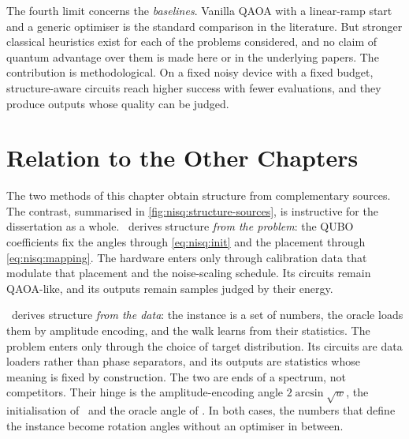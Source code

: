 The fourth limit concerns the \emph{baselines}. Vanilla QAOA with a linear-ramp start and a generic optimiser is the standard comparison in the literature. But stronger classical heuristics exist for each of the problems considered, and no claim of quantum advantage over them is made here or in the underlying papers. The contribution is methodological. On a fixed noisy device with a fixed budget, structure-aware circuits reach higher success with fewer evaluations, and they produce outputs whose quality can be judged.

\section{Relation to the Other Chapters}\label{sec:nisq:relation}

The two methods of this chapter obtain structure from complementary sources. The contrast, summarised in \cref{fig:nisq:structure-sources}, is instructive for the dissertation as a whole. \deal\ derives structure \emph{from the problem}: the QUBO coefficients fix the angles through \cref{eq:nisq:init} and the placement through \cref{eq:nisq:mapping}. The hardware enters only through calibration data that modulate that placement and the noise-scaling schedule. Its circuits remain QAOA-like, and its outputs remain samples judged by their energy.

\qawa\ derives structure \emph{from the data}: the instance is a set of numbers, the oracle loads them by amplitude encoding, and the walk learns from their statistics. The problem enters only through the choice of target distribution. Its circuits are data loaders rather than phase separators, and its outputs are statistics whose meaning is fixed by construction. The two are ends of a spectrum, not competitors. Their hinge is the amplitude-encoding angle $2\arcsin\sqrt{w}$, the initialisation of \deal\ and the oracle angle of \qawa. In both cases, the numbers that define the instance become rotation angles without an optimiser in between.

